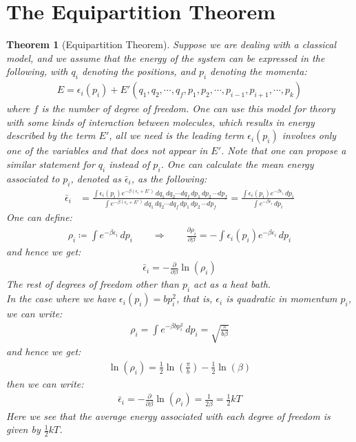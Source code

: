 \documentclass[11pt,oneside]{book}
\theoremstyle{break}
\theoremstyle{break}
\newtheorem{thm}{Theorem}[section]
\begin{document}
\section[The Equipartition Theorem]{\color{red} The Equipartition Theorem\color{black}}
\begin{thm}[Equipartition Theorem]
Suppose we are dealing with a classical model, and we assume that the energy of the system can be expressed in the following, with $q_i$ denoting the positions, and $p_i$ denoting the momenta:
\begin{align*}
E = \epsilon_i(p_i) + E'(q_1, q_2,\cdots, q_f, p_1,p_2,\cdots, p_{i-1}, p_{i+1}, \cdots, p_k)
\end{align*}
where $f$ is the number of degree of freedom. One can use this model for theory with some kinds of interaction between molecules, which results in energy described by the term $E'$, all we need is the leading term $\epsilon_i (p_i)$ involves only one of the variables and that does not appear in $E'$. Note that one can propose a similar statement for $q_i$ instead of $p_i$. One can calculate the mean energy associated to $p_i$, denoted as $\bar{\epsilon}_i$, as the following:
\begin{align*}
\bar{\epsilon}_i &= \frac{\int \epsilon_i(p_i) e^{-\beta(\epsilon_i +E')}\,dq_1\,dq_2 \cdots dq_f\,dp_1\, dp_2\,\cdots dp_f }{\int  e^{-\beta(\epsilon_i +E')}\,dq_1\,dq_2 \cdots dq_f\,dp_1\, dp_2\,\cdots dp_f}= \frac{\int \epsilon_i (p_i) e^{-\beta \epsilon_i}\, dp_i}{\int e^{-\beta \epsilon_i}\, dp_i}
\end{align*}
One can define:
\begin{align*}
\rho_i \coloneqq \int e^{-\beta \epsilon_i}\, dp_i \qquad \Rightarrow \qquad \frac{\partial \rho_i}{\partial \beta} = -\int \epsilon_i (p_i) e^{-\beta \epsilon_i}\, dp_i
\end{align*}
and hence we get:
\begin{align*}
\bar{\epsilon}_i = -\frac{\partial}{\partial \beta} \ln(\rho_i)
\end{align*}
The rest of degrees of freedom other than $p_i$ act as a heat bath.\\ 
In the case where we have $\epsilon_i(p_i) = bp_i^2$, that is, $\epsilon_i$ is quadratic in momentum $p_i$, we can write:
\begin{align*}
\rho_i = \int e^{-\beta bp_i^2} \, dp_i = \sqrt{\frac{\pi}{b\beta}}
\end{align*}
and hence we get:
\begin{align*}
\ln(\rho_i) = \frac{1}{2}\ln\left( \frac{\pi}{b}\right) - \frac{1}{2}\ln(\beta)
\end{align*}
then we can write:
\begin{align*}
\bar{\epsilon}_i = -\frac{\partial }{\partial \beta}\ln(\rho_i) = \frac{1}{2\beta} = \frac{1}{2}kT
\end{align*}
Here we see that the average energy associated with each degree of freedom is given by $\frac{1}{2}kT$.
\end{thm}
\end{document}
